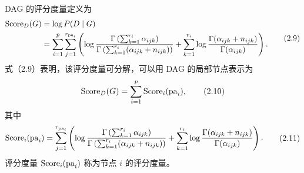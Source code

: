 DAG 的评分度量定义为
\begin{equation}
\begin{aligned}
\operatorname{Score}_D(G)&=\log P(D\mid G)\\
&=\sum_{i=1}^{p}\sum_{j=1}^{r_{\mathrm{pa}_i}}
\left(
\log\frac{\Gamma\left(\sum_{k=1}^{r_i}\alpha_{ijk}\right)}
{\Gamma\left(\sum_{k=1}^{r_i}(\alpha_{ijk}+n_{ijk})\right)}
+\sum_{k=1}^{r_i}\log\frac{\Gamma(\alpha_{ijk}+n_{ijk})}{\Gamma(\alpha_{ijk})}
\right).
\end{aligned}\tag{2.9}
\end{equation}
式（2.9）表明，该评分度量可分解，可以用 DAG 的局部节点表示为
\begin{equation}
\operatorname{Score}_D(G)=\sum_{i=1}^{p}\operatorname{Score}_i(\mathrm{pa}_i),
\tag{2.10}
\end{equation}
其中
\begin{equation}
\begin{aligned}
\operatorname{Score}_i(\mathrm{pa}_i)
=\sum_{j=1}^{r_{\mathrm{pa}_i}}\left(
\log\frac{\Gamma\left(\sum_{k=1}^{r_i}\alpha_{ijk}\right)}
{\Gamma\left(\sum_{k=1}^{r_i}(\alpha_{ijk}+n_{ijk})\right)}
+\sum_{k=1}^{r_i}\log\frac{\Gamma(\alpha_{ijk}+n_{ijk})}{\Gamma(\alpha_{ijk})}
\right).
\end{aligned}\tag{2.11}
\end{equation}
评分度量 $\operatorname{Score}_i(\mathrm{pa}_i)$ 称为节点 $i$ 的评分度量。

